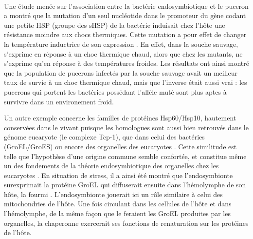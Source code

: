 \paragraph*{}
Une étude menée sur l'association entre la bactérie endosymbiotique  et le puceron  a montré que la mutation d'un seul nucléotide dans le promoteur du gène  codant une petite HSP (groupe des sHSP) de la bactérie induisait chez l'hôte une résistance moindre aux chocs thermiques.
Cette mutation a pour effet de changer la température inductrice de son expression \cite{dunbar2007}.
En effet, dans la souche sauvage,  s'exprime en réponse à un choc thermique chaud, alors que chez les mutants,  ne s'exprime qu'en réponse à des températures froides.
Les résultats ont ainsi montré que la population de pucerons infectés par la souche sauvage avait un meilleur taux de survie à un choc thermique chaud, mais que l'inverse était aussi vrai : les pucerons qui portent les bactéries possédant l'allèle muté sont plus aptes à survivre dans un environement froid.

Un autre exemple concerne les familles de protéines Hsp60/Hsp10, hautement conservées dans le vivant puisque les homologues sont aussi bien retrouvés dans le génome eucaryote (le complexe Tcp-1), que dans celui des bactéries (GroEL/GroES) ou encore des organelles des eucaryotes \cite{gupta1995}.
Cette similitude est telle que l'hypothèse d'une origine commune semble confortée, et constitue même un des fondements de la théorie endosymbiotique des organelles chez les eucaryotes \cite{gupta1995}.
En situation de stress, il a ainsi été montré que l'endosymbionte  surexprimait la protéine GroEL qui diffuserait ensuite dans l'hémolymphe de son hôte, la fourmi  \cite{stoll2009, feldhaar2011}.
L'endosymbionte jouerait ici un rôle similaire à celui des mitochondries de l'hôte.
Une fois circulant dans les cellules de l'hôte et dans l'hémolymphe, de la même façon que le feraient les GroEL produites par les organelles, la chaperonne exercerait ses fonctions de renaturation sur les protéines de l'hôte.

